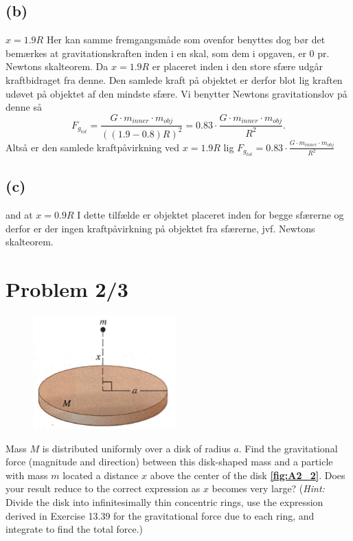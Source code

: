 \documentclass[12pt]{article}
\theoremstyle{definition}
\begin{document}
\subsection*{(b)}
$x = \num{1,9} R$
\bigbreak
Her kan samme fremgangsmåde som ovenfor benyttes dog bør det bemærkes at gravitationskraften inden i en skal, som dem i opgaven, er 0 pr. Newtons skalteorem. Da $x = \num{1,9}R$ er placeret inden i den store sfære udgår kraftbidraget fra denne. Den samlede kraft på objektet er derfor blot lig kraften udøvet på objektet af den mindste sfære. Vi benytter Newtons gravitationslov på denne så
\[ 
F_{g_{tot}} = \frac{G \cdot m_{inner} \cdot m_{obj}}{((\num{1,9} - \num{0,8})R)^2} = \num{0,83} \cdot \frac{G \cdot m_{inner} \cdot m_{obj}}{R^2}
.\]
Altså er den samlede kraftpåvirkning ved $x = \num{1,9} R$ lig \underline{\underline{$F_{g_{tot}} = \num{0,83} \cdot \frac{G \cdot m_{inner} \cdot m_{obj}}{R^2}$}}


\subsection*{(c)}
and at $x = \num{0,9} R$
\bigbreak
I dette tilfælde er objektet placeret inden for begge sfærerne og derfor er der ingen kraft\-påvirk\-ning på objektet fra sfærerne, jvf. Newtons skalteorem. 


\section*{Problem 2/3}
\begin{figure}
  \vspace{-40pt}
  \includegraphics[width=5.5cm]{../figures/A2_2.png}
  \caption{}
  \label{fig:A2_2}
\end{figure}

Mass $M$ is distributed uniformly over a disk of radius $a$. Find the gravitational force (magnitude and direction) between this disk-shaped mass and a particle with mass $m$ located a distance $x$ above the center of the disk \textbf{\autoref{fig:A2_2}}. Does your result reduce to the correct expression as $x$ becomes very large? (\textit{Hint:} Divide the disk into infinitesimally thin concentric rings, use the expression derived in Exercise 13.39 for the gravitational force due to each ring, and integrate to find the total force.)
\end{document}
